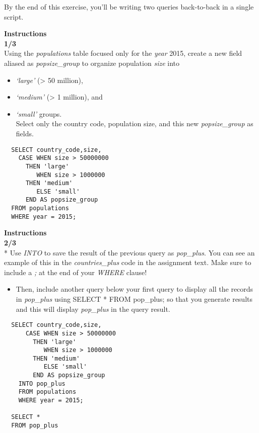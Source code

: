 \documentclass[
]{article}
\providecommand{\tightlist}{%
  \setlength{\itemsep}{0pt}\setlength{\parskip}{0pt}}
\begin{document}
By the end of this exercise, you'll be writing two queries back-to-back
in a single script.

\textbf{Instructions}\\
\textbf{1/3}\\
Using the \emph{populations} table focused only for the \emph{year}
2015, create a new field aliased as \emph{popsize\_group} to organize
population \emph{size} into

\begin{itemize}
\tightlist
\item
  \emph{`large'} (\textgreater{} 50 million),\\
\item
  \emph{`medium'} (\textgreater{} 1 million), and\\
\item
  \emph{`small'} groups.\\
  Select only the country code, population size, and this new
  \emph{popsize\_group} as fields.
\end{itemize}

\begin{verbatim}
  SELECT country_code,size,
    CASE WHEN size > 50000000
      THEN 'large'
         WHEN size > 1000000
      THEN 'medium'
         ELSE 'small' 
      END AS popsize_group
  FROM populations
  WHERE year = 2015;
\end{verbatim}

\textbf{Instructions}\\
\textbf{2/3}\\
* Use \emph{INTO} to save the result of the previous query as
\emph{pop\_plus}. You can see an example of this in the
\emph{countries\_plus} code in the assignment text. Make sure to include
a \emph{;} at the end of your \emph{WHERE} clause!

\begin{itemize}
\tightlist
\item
  Then, include another query below your first query to display all the
  records in \emph{pop\_plus} using SELECT * FROM pop\_plus; so that you
  generate results and this will display \emph{pop\_plus} in the query
  result.
\end{itemize}

\begin{verbatim}
  SELECT country_code,size,
      CASE WHEN size > 50000000
        THEN 'large'
           WHEN size > 1000000
        THEN 'medium'
           ELSE 'small' 
        END AS popsize_group
    INTO pop_plus
    FROM populations
    WHERE year = 2015;
    
  SELECT *
  FROM pop_plus
\end{verbatim}
\end{document}
